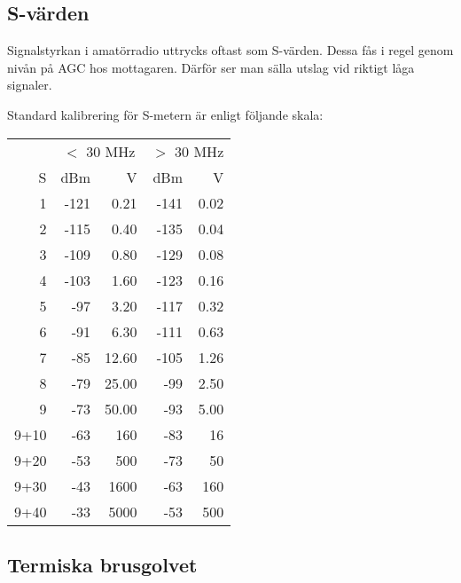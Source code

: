 \subsection{S-värden}

Signalstyrkan i amatörradio uttrycks oftast som S-värden. Dessa fås i regel genom nivån på AGC hos mottagaren. Därför ser man sälla utslag vid riktigt låga signaler.

Standard kalibrering för S-metern är enligt följande skala:

\begin{center}
\begin{tabular}{r|rr|rr}
	     & \multicolumn{2}{c|}{$<$ 30 MHz} & \multicolumn{2}{c}{$>$ 30 MHz} \\
	   S &  dBm &                \textmu V &  dBm &               \textmu V \\ \hline
	   1 & -121 &                     0.21 & -141 &                    0.02 \\
	   2 & -115 &                     0.40 & -135 &                    0.04 \\
	   3 & -109 &                     0.80 & -129 &                    0.08 \\
	   4 & -103 &                     1.60 & -123 &                    0.16 \\
	   5 &  -97 &                     3.20 & -117 &                    0.32 \\
	   6 &  -91 &                     6.30 & -111 &                    0.63 \\
	   7 &  -85 &                    12.60 & -105 &                    1.26 \\
	   8 &  -79 &                    25.00 &  -99 &                    2.50 \\
	   9 &  -73 &                    50.00 &  -93 &                    5.00 \\
	9+10 &  -63 &                      160 &  -83 &                      16 \\
	9+20 &  -53 &                      500 &  -73 &                      50 \\
	9+30 &  -43 &                     1600 &  -63 &                     160 \\
	9+40 &  -33 &                     5000 &  -53 &                     500
\end{tabular}
\end{center}
\subsection{Termiska brusgolvet}

